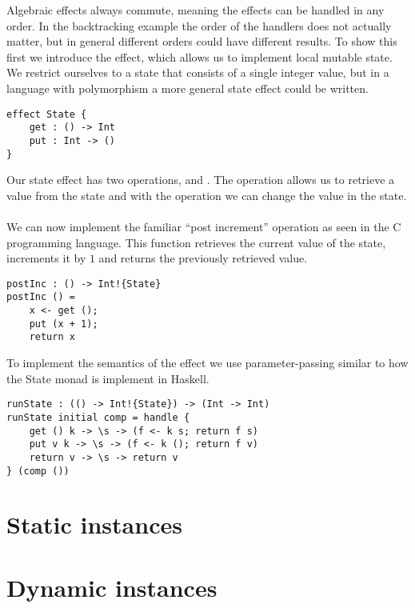 {Algebraic effects always commute, meaning the effects can be handled in any order.
In the backtracking example the order of the handlers does not actually matter, but in general different orders could have different results.
To show this first we introduce the  effect, which allows us to implement local mutable state.
We restrict ourselves to a state that consists of a single integer value, but in a language with polymorphism a more general state effect could be written.

\begin{verbatim}
effect State {
	get : () -> Int
	put : Int -> ()
}
\end{verbatim}

Our state effect has two operations,  and .
The  operation allows us to retrieve a value from the state and with the  operation we can change the value in the state.
\\\\
We can now implement the familiar ``post increment'' operation as seen in the C programming language.
This function retrieves the current value of the state, increments it by $1$ and returns the previously retrieved value.

\begin{verbatim}
postInc : () -> Int!{State}
postInc () =
	x <- get ();
	put (x + 1);
	return x
\end{verbatim}

To implement the semantics of the  effect we use parameter-passing similar to how the State monad is implement in Haskell.

\begin{verbatim}
runState : (() -> Int!{State}) -> (Int -> Int)
runState initial comp = handle {
	get () k -> \s -> (f <- k s; return f s)
	put v k -> \s -> (f <- k (); return f v)
	return v -> \s -> return v
} (comp ())
\end{verbatim}



\section{Static instances} \label{section:background-staticinst}


\section{Dynamic instances} \label{section:background-dynamicinst}




}